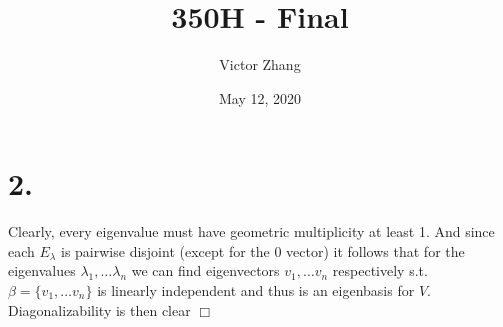 \documentclass{article}
\title{350H - Final}
\author{Victor Zhang}
\date{May 12, 2020}
\begin{document}
\maketitle

\section*{2.}
Clearly, every eigenvalue must have geometric multiplicity at least 1. And since each $E_\lambda$ is pairwise disjoint (except for the 0 vector) it follows that for the eigenvalues $\lambda_1, \dots \lambda_n$ we can find eigenvectors $v_1, \dots v_n$ respectively s.t. $\beta = \{ v_1,\dots v_n\}$ is linearly independent and thus is an eigenbasis for $V$. Diagonalizability is then clear $\Box$
\end{document}

